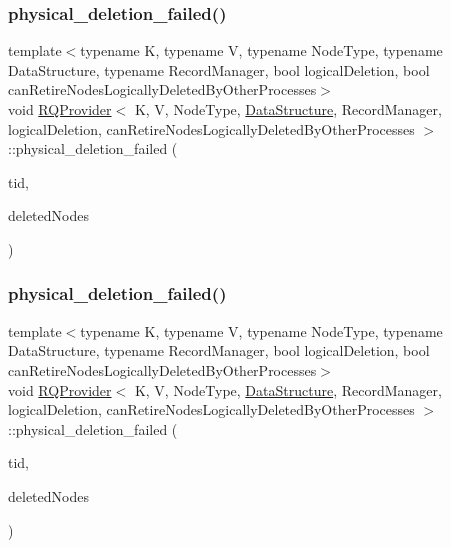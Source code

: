\mbox{\label{classRQProvider_a1fb29a074556e0431ed22f2bee394c22}} 
\subsubsection{\texorpdfstring{physical\+\_\+deletion\+\_\+failed()}{physical\_deletion\_failed()}\hspace{0.1cm}{\footnotesize\ttfamily [4/5]}}
{\footnotesize\ttfamily template$<$typename K, typename V, typename Node\+Type, typename Data\+Structure, typename Record\+Manager, bool logical\+Deletion, bool can\+Retire\+Nodes\+Logically\+Deleted\+By\+Other\+Processes$>$ \\
void \hyperlink{classRQProvider}{R\+Q\+Provider}$<$ K, V, Node\+Type, \hyperlink{classDataStructure}{Data\+Structure}, Record\+Manager, logical\+Deletion, can\+Retire\+Nodes\+Logically\+Deleted\+By\+Other\+Processes $>$\+::physical\+\_\+deletion\+\_\+failed (\begin{DoxyParamCaption}\item[{const int}]{tid,  }\item[{Node\+Type $\ast$const $\ast$const}]{deleted\+Nodes }\end{DoxyParamCaption})\hspace{0.3cm}{\ttfamily [inline]}}

\mbox{\label{classRQProvider_a1fb29a074556e0431ed22f2bee394c22}} 
\subsubsection{\texorpdfstring{physical\+\_\+deletion\+\_\+failed()}{physical\_deletion\_failed()}\hspace{0.1cm}{\footnotesize\ttfamily [5/5]}}
{\footnotesize\ttfamily template$<$typename K, typename V, typename Node\+Type, typename Data\+Structure, typename Record\+Manager, bool logical\+Deletion, bool can\+Retire\+Nodes\+Logically\+Deleted\+By\+Other\+Processes$>$ \\
void \hyperlink{classRQProvider}{R\+Q\+Provider}$<$ K, V, Node\+Type, \hyperlink{classDataStructure}{Data\+Structure}, Record\+Manager, logical\+Deletion, can\+Retire\+Nodes\+Logically\+Deleted\+By\+Other\+Processes $>$\+::physical\+\_\+deletion\+\_\+failed (\begin{DoxyParamCaption}\item[{const int}]{tid,  }\item[{Node\+Type $\ast$const $\ast$const}]{deleted\+Nodes }\end{DoxyParamCaption})\hspace{0.3cm}{\ttfamily [inline]}}

